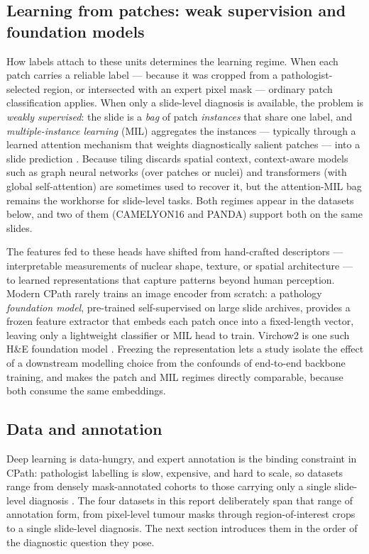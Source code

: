 \documentclass[11pt]{article}
\begin{document}
\subsection{Learning from patches: weak supervision and foundation models}
\label{sec:learning}
How labels attach to these units determines the learning regime. When each patch carries a reliable
label --- because it was cropped from a pathologist-selected region, or intersected with an expert
pixel mask --- ordinary patch classification applies. When only a slide-level diagnosis is
available, the problem is \emph{weakly supervised}: the slide is a \emph{bag} of patch
\emph{instances} that share one label, and \emph{multiple-instance learning} (MIL) aggregates the
instances --- typically through a learned attention mechanism that weights diagnostically salient
patches --- into a slide prediction \citep{song2023aiPathology,hosseini2024computationalPathology}.
Because tiling discards spatial context, context-aware models such as graph neural networks (over
patches or nuclei) and transformers (with global self-attention) are sometimes used to recover it,
but the attention-MIL bag remains the workhorse for slide-level tasks. Both regimes appear in the
datasets below, and two of them (CAMELYON16 and PANDA) support both on the same slides.

The features fed to these heads have shifted from hand-crafted descriptors --- interpretable
measurements of nuclear shape, texture, or spatial architecture --- to learned representations that
capture patterns beyond human perception. Modern CPath rarely trains an image encoder from scratch:
a pathology \emph{foundation model}, pre-trained self-supervised on large slide archives, provides a
frozen feature extractor that embeds each patch once into a fixed-length vector, leaving only a
lightweight classifier or MIL head to train. Virchow2 is one such H\&E foundation model
\citep{vorontsov2024virchow,zimmermann2024virchow2}. Freezing the representation lets a study isolate
the effect of a downstream modelling choice from the confounds of end-to-end backbone training, and
makes the patch and MIL regimes directly comparable, because both consume the same embeddings.

\subsection{Data and annotation}
\label{sec:data-challenge}
Deep learning is data-hungry, and expert annotation is the binding constraint in CPath: pathologist
labelling is slow, expensive, and hard to scale, so datasets range from densely mask-annotated
cohorts to those carrying only a single slide-level diagnosis
\citep{abels2019computationalPathology,hosseini2024computationalPathology}. The four datasets in this
report deliberately span that range of annotation form, from pixel-level tumour masks through
region-of-interest crops to a single slide-level diagnosis. The next section introduces them in the
order of the diagnostic question they pose.
\end{document}
